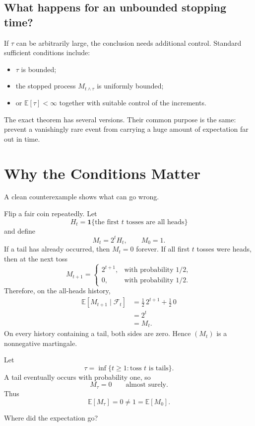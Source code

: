 \documentclass[en,nofont,11pt]{elegantbook}
\newcommand{\E}{\mathbb{E}}
\newcommand{\one}{\mathbf{1}}
\newcommand{\F}{\mathcal{F}}
\begin{document}
\section{What happens for an unbounded stopping time?}

If $\tau$ can be arbitrarily large, the conclusion needs additional control. Standard sufficient conditions include:

\begin{itemize}
\item $\tau$ is bounded;
\item the stopped process $M_{t\wedge\tau}$ is uniformly bounded;
\item or $\E[\tau]<\infty$ together with suitable control of the increments.
\end{itemize}

The exact theorem has several versions. Their common purpose is the same: prevent a vanishingly rare event from carrying a huge amount of expectation far out in time.

\chapter{Why the Conditions Matter}

A clean counterexample shows what can go wrong.

Flip a fair coin repeatedly. Let
\[
H_t=\one\{\text{the first }t\text{ tosses are all heads}\}
\]
and define
\[
M_t=2^tH_t,
\qquad M_0=1.
\]
If a tail has already occurred, then $M_t=0$ forever. If all first $t$ tosses were heads, then at the next toss
\[
M_{t+1}
=
\begin{cases}
2^{t+1}, & \text{with probability }1/2,\\
0, & \text{with probability }1/2.
\end{cases}
\]
Therefore, on the all-heads history,
\begin{align*}
\E[M_{t+1}\mid\F_t]
&=\frac12\,2^{t+1}+\frac12\,0\\
&=2^t\\
&=M_t.
\end{align*}
On every history containing a tail, both sides are zero. Hence $(M_t)$ is a nonnegative martingale.

Let
\[
\tau=\inf\{t\ge1:\text{toss }t\text{ is tails}\}.
\]
A tail eventually occurs with probability one, so
\[
M_\tau=0
\qquad\text{almost surely}.
\]
Thus
\[
\E[M_\tau]=0
\neq
1=\E[M_0].
\]

Where did the expectation go?
\end{document}

